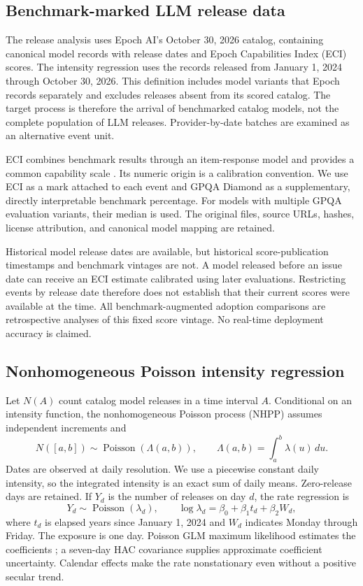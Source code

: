 \subsection{Benchmark-marked LLM release data}
The release analysis uses Epoch AI's October 30, 2026 catalog, containing \CatalogAll{} canonical model records with release dates and Epoch Capabilities Index (ECI) scores. The intensity regression uses the \CatalogEvents{} records released from January 1, 2024 through October 30, 2026. This definition includes model variants that Epoch records separately and excludes releases absent from its scored catalog. The target process is therefore the arrival of benchmarked catalog models, not the complete population of LLM releases. Provider-by-date batches are examined as an alternative event unit.

ECI combines benchmark results through an item-response model and provides a common capability scale \cite{epoch}. Its numeric origin is a calibration convention. We use ECI as a mark attached to each event and GPQA Diamond as a supplementary, directly interpretable benchmark percentage. For models with multiple GPQA evaluation variants, their median is used. The original files, source URLs, hashes, license attribution, and canonical model mapping are retained.

Historical model release dates are available, but historical score-publication timestamps and benchmark vintages are not. A model released before an issue date can receive an ECI estimate calibrated using later evaluations. Restricting events by release date therefore does not establish that their current scores were available at the time. All benchmark-augmented adoption comparisons are retrospective analyses of this fixed score vintage. No real-time deployment accuracy is claimed.

\subsection{Nonhomogeneous Poisson intensity regression}
Let $N(A)$ count catalog model releases in a time interval $A$. Conditional on an intensity function, the nonhomogeneous Poisson process (NHPP) assumes independent increments and
\begin{equation}
 N([a,b])\sim\operatorname{Poisson}\!\left(\Lambda(a,b)\right),\qquad
 \Lambda(a,b)=\int_a^b\lambda(u)\,du.
\end{equation}
Dates are observed at daily resolution. We use a piecewise constant daily intensity, so the integrated intensity is an exact sum of daily means. Zero-release days are retained. If $Y_d$ is the number of releases on day $d$, the rate regression is
\begin{equation}
 Y_d\sim\operatorname{Poisson}(\lambda_d),\qquad
 \log\lambda_d=\beta_0+\beta_1t_d+\beta_2W_d,
 \label{eq:nhpp-rate}
\end{equation}
where $t_d$ is elapsed years since January 1, 2024 and $W_d$ indicates Monday through Friday. The exposure is one day. Poisson GLM maximum likelihood estimates the coefficients \cite{glm}; a seven-day HAC covariance supplies approximate coefficient uncertainty. Calendar effects make the rate nonstationary even without a positive secular trend.

